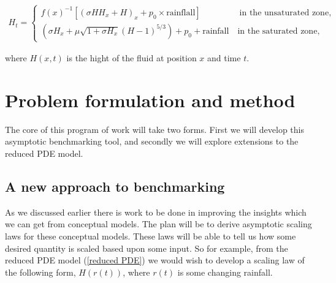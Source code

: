 \documentclass[11pt]{article}
\begin{document}
 \begin{align}
    H_t=\begin{cases}
        f(x)^{-1}[(\sigma HH_x+H)_x+p_0\times\text {rainflall}] \qquad \qquad  \ \; \text{in the unsaturated zone},\\
        (\sigma H_x+\mu\sqrt{1+\sigma H_x}(H-1)^{5/3})+p_0 +\text{rainfall} \quad \text{in the saturated zone}, \label{reduced PDE}
    \end{cases}
\end{align}

where $H(x,t)$ is the hight of the fluid at position $x$ and time $t$.


\section{Problem formulation and method}
The core of this program of work will take two forms. First we will develop this asymptotic benchmarking tool, and secondly we will explore extensions to the reduced PDE model. 
\subsection{A new approach to benchmarking}
As we discussed earlier there is work to be done in improving the insights which we can get from conceptual models. The plan will be to derive asymptotic scaling laws for these conceptual models. These laws will be able to tell us how some desired quantity is scaled based upon some input. So for example, from the reduced PDE model (\ref{reduced PDE}) we would wish to develop a scaling law of the following form, $H(r(t))$, where $r(t)$ is some changing rainfall. 

\vspace{5pt}
\end{document}
